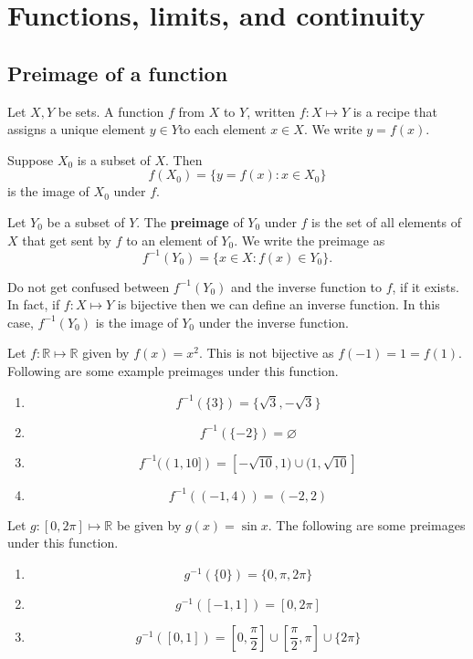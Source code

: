 \chapter{Functions, limits, and continuity}

\section{Preimage of a function}

Let $X,Y$ be sets. A function $f$ from $X$ to $Y$, written $f:X\mapsto Y$ is a recipe that assigns a unique element $y\in Y$to each element $x\in X$. We write $y=f(x)$.

Suppose $X_0$ is a subset of $X$. Then \[f(X_0)=\{y=f(x):x\in X_0\}\] is the image of $X_0$ under $f$.

\begin{definition}
    Let $Y_0$ be a subset of $Y$. The \textbf{preimage} of $Y_0$ under $f$ is the set of all elements of $X$ that get sent by $f$ to an element of $Y_0$. We write the preimage as \[f^{-1}(Y_0)=\{x\in X:f(x)\in Y_0\}.\]
\end{definition}

\begin{remark}
    Do not get confused between $f^{-1}(Y_0)$ and the inverse function to $f$, if it exists. In fact, if $f:X\mapsto Y$ is bijective then we can define an inverse function. In this case, $f^{-1}(Y_0)$ is the image of $Y_0$ under the inverse function.
\end{remark}

\begin{example}
    Let $f:\mathbb R\mapsto\mathbb R$ given by $f(x)=x^2$. This is not bijective as $f(-1)=1=f(1)$. Following are some example preimages under this function.
    \begin{enumerate}
        \item \[f^{-1}(\{3\})=\{\sqrt3,-\sqrt3\}\]
        \item \[f^{-1}(\{-2\})=\varnothing\]
        \item \[f^{-1}((1,10])=[-\sqrt{10},1)\cup(1,\sqrt{10}]\]
        \item \[f^{-1}((-1,4))=(-2,2)\]
    \end{enumerate}
\end{example}

\begin{example}
    Let $g:[0,2\pi]\mapsto\mathbb R$ be given by $g(x)=\sin{x}$. The following are some preimages under this function.
    \begin{enumerate}
        \item \[g^{-1}(\{0\})=\{0,\pi,2\pi\}\]
        \item \[g^{-1}([-1,1])=[0,2\pi]\]
        \item \[g^{-1}([0,1])=\left[0,\frac\pi2\right]\cup\left[\frac\pi2,\pi\right]\cup\{2\pi\}\]
    \end{enumerate}
\end{example}

